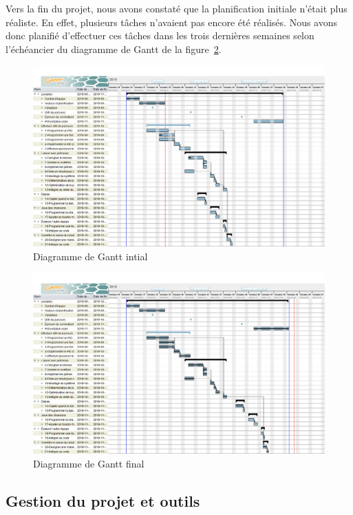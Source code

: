 Vers la fin du projet, nous avons constaté que la planification initiale n'était plus réaliste.
En effet, plusieurs tâches n'avaient pas encore été réalisés.
Nous avons donc planifié d'effectuer ces tâches dans les trois dernières semaines selon l'échéancier du diagramme de Gantt de la figure~\ref{fig:planif-final}.

\begin{figure}[h!]
    \centering
    \includegraphics[width=\linewidth]{img/s1/robuck-2019-09-26}
    \caption{Diagramme de Gantt intial}
    \label{fig:planif-initial}
\end{figure}

\begin{figure}[h!]
    \centering
    \includegraphics[width=\linewidth]{img/s1/robuck-2019-12-06.png}
    \caption{Diagramme de Gantt final}
    \label{fig:planif-final}
\end{figure}

\clearpage

\subsection{Gestion du projet et outils}

